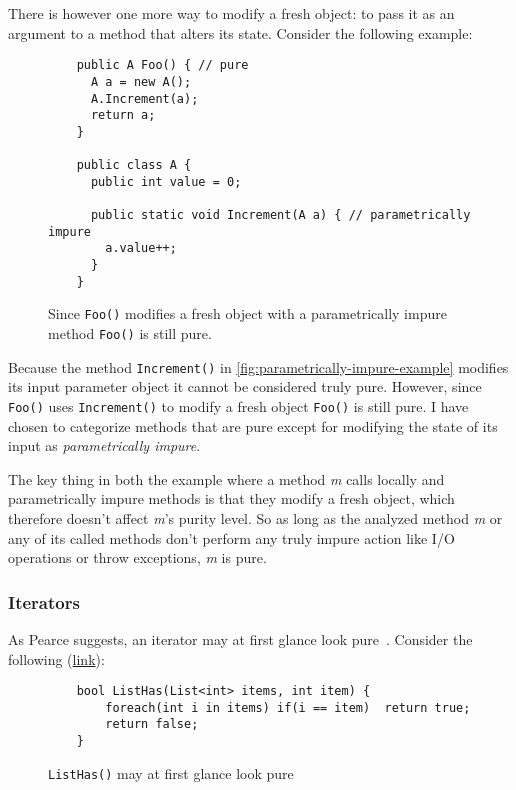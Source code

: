 \documentclass[a4paper,12pt]{article}
\begin{document}
There is however one more way to modify a fresh object: to pass it as an argument to a method that alters its state. Consider the following example:

\begin{figure}[H]
  \centering
  \begin{lstlisting}
    public A Foo() { // pure
      A a = new A();
      A.Increment(a);
      return a;
    }

    public class A {
      public int value = 0;

      public static void Increment(A a) { // parametrically impure
        a.value++;
      }
    }
  \end{lstlisting}
  \caption{Since \texttt{Foo()} modifies a fresh object with a parametrically impure method \texttt{Foo()} is still pure.}
  \label{fig:parametrically-impure-example}
\end{figure}

Because the method \texttt{Increment()} in \autoref{fig:parametrically-impure-example} modifies its input parameter object it cannot be considered truly pure. However, since \texttt{Foo()} uses \texttt{Increment()} to modify a fresh object \texttt{Foo()} is still pure. I have chosen to categorize methods that are pure except for modifying the state of its input as \textit{parametrically impure}. %

The key thing in both the example where a method \textit{m} calls locally and parametrically impure methods is that they modify a fresh object, which therefore doesn't affect \textit{m}'s purity level. So as long as the analyzed method \textit{m} or any of its called methods don't perform any truly impure action like I/O operations or throw exceptions, \textit{m} is pure.

\subsubsection{Iterators}


As Pearce suggests, an iterator may at first glance look pure~\cite{pearce2011jpure}. Consider the following (\href{https://docs.microsoft.com/en-us/archive/msdn-magazine/2017/april/essential-net-understanding-csharp-foreach-internals-and-custom-iterators-with-yield}{link}):

\begin{figure}[H]
  \centering
  \begin{lstlisting}
    bool ListHas(List<int> items, int item) {
        foreach(int i in items) if(i == item)  return true;
        return false;
    }
  \end{lstlisting}
  \caption{\texttt{ListHas()} may at first glance look pure}
  \label{fig:iterator-example}
\end{figure}
\end{document}
